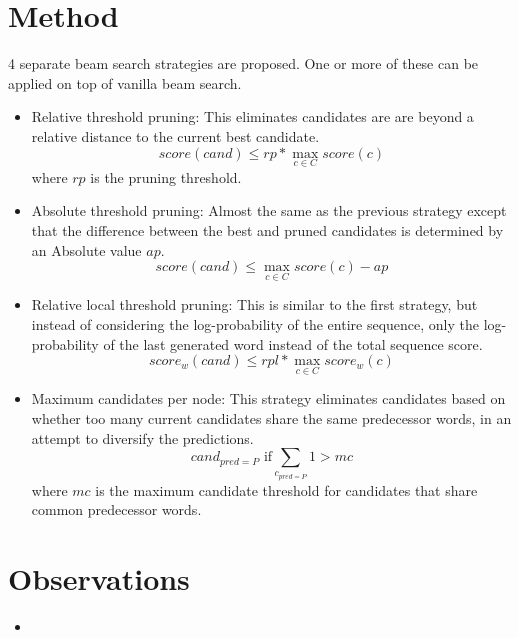 \documentclass[12pt]{scrartcl}
\begin{document}
\section{Method}
  4 separate beam search strategies are proposed. One or more of these can be applied on top of vanilla beam search.
  \begin{itemize}
    \item Relative threshold pruning: This eliminates candidates are are beyond a relative distance to the current best candidate.
    $$score(cand) \leq rp * \max_{c \in C} {score(c)}$$
    where $rp$ is the pruning threshold.
    \item Absolute threshold pruning: Almost the same as the previous strategy except that the difference between the best and pruned candidates is determined by an Absolute value $ap$.
    $$score(cand) \leq \max_{c \in C} {score(c)} - ap$$
    \item Relative local threshold pruning: This is similar to the first strategy, but instead of considering the log-probability of the entire sequence, only the log-probability of the last generated word instead of the total sequence score.
    $$score_w(cand) \leq rpl * \max_{c \in C} {score_w(c)}$$
    \item Maximum candidates per node: This strategy eliminates candidates based on whether too many current candidates share the same predecessor words, in an attempt to diversify the predictions.
    $$cand_{pred = P} \text{ if} \sum_{c_{pred = P}} 1 > mc$$
    where $mc$ is the maximum candidate threshold for candidates that share common predecessor words.
  \end{itemize}

\section{Observations}
  \begin{itemize}
    \item 
  \end{itemize}



\end{document}
